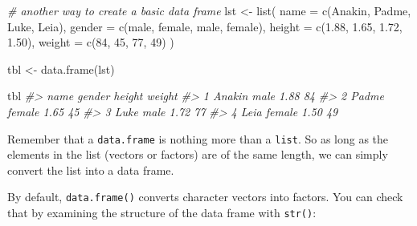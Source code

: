 \documentclass[
]{book}
\newenvironment{Shaded}{\begin{snugshade}}{\end{snugshade}}
\newcommand{\AttributeTok}[1]{\textcolor[rgb]{0.77,0.63,0.00}{#1}}
\newcommand{\CommentTok}[1]{\textcolor[rgb]{0.56,0.35,0.01}{\textit{#1}}}
\newcommand{\DecValTok}[1]{\textcolor[rgb]{0.00,0.00,0.81}{#1}}
\newcommand{\FloatTok}[1]{\textcolor[rgb]{0.00,0.00,0.81}{#1}}
\newcommand{\FunctionTok}[1]{\textcolor[rgb]{0.00,0.00,0.00}{#1}}
\newcommand{\NormalTok}[1]{#1}
\newcommand{\OtherTok}[1]{\textcolor[rgb]{0.56,0.35,0.01}{#1}}
\newcommand{\StringTok}[1]{\textcolor[rgb]{0.31,0.60,0.02}{#1}}
\begin{document}
\begin{Shaded}
\begin{Highlighting}[]
\CommentTok{\# another way to create a basic data frame}
\NormalTok{lst }\OtherTok{\textless{}{-}} \FunctionTok{list}\NormalTok{(}
  \AttributeTok{name =} \FunctionTok{c}\NormalTok{(}\StringTok{\textquotesingle{}Anakin\textquotesingle{}}\NormalTok{, }\StringTok{\textquotesingle{}Padme\textquotesingle{}}\NormalTok{, }\StringTok{\textquotesingle{}Luke\textquotesingle{}}\NormalTok{, }\StringTok{\textquotesingle{}Leia\textquotesingle{}}\NormalTok{),}
  \AttributeTok{gender =} \FunctionTok{c}\NormalTok{(}\StringTok{\textquotesingle{}male\textquotesingle{}}\NormalTok{, }\StringTok{\textquotesingle{}female\textquotesingle{}}\NormalTok{, }\StringTok{\textquotesingle{}male\textquotesingle{}}\NormalTok{, }\StringTok{\textquotesingle{}female\textquotesingle{}}\NormalTok{),}
  \AttributeTok{height =} \FunctionTok{c}\NormalTok{(}\FloatTok{1.88}\NormalTok{, }\FloatTok{1.65}\NormalTok{, }\FloatTok{1.72}\NormalTok{, }\FloatTok{1.50}\NormalTok{),}
  \AttributeTok{weight =} \FunctionTok{c}\NormalTok{(}\DecValTok{84}\NormalTok{, }\DecValTok{45}\NormalTok{, }\DecValTok{77}\NormalTok{, }\DecValTok{49}\NormalTok{)}
\NormalTok{)}

\NormalTok{tbl }\OtherTok{\textless{}{-}} \FunctionTok{data.frame}\NormalTok{(lst)}

\NormalTok{tbl}
\CommentTok{\#\textgreater{}     name gender height weight}
\CommentTok{\#\textgreater{} 1 Anakin   male   1.88     84}
\CommentTok{\#\textgreater{} 2  Padme female   1.65     45}
\CommentTok{\#\textgreater{} 3   Luke   male   1.72     77}
\CommentTok{\#\textgreater{} 4   Leia female   1.50     49}
\end{Highlighting}
\end{Shaded}

Remember that a \texttt{data.frame} is nothing more than a \texttt{list}. So as long as the
elements in the list (vectors or factors) are of the same length, we can simply
convert the list into a data frame.

By default, \texttt{data.frame()} converts character vectors into factors. You can
check that by examining the structure of the data frame with \texttt{str()}:

\begin{Shaded}
\end{Shaded}
\end{document}
